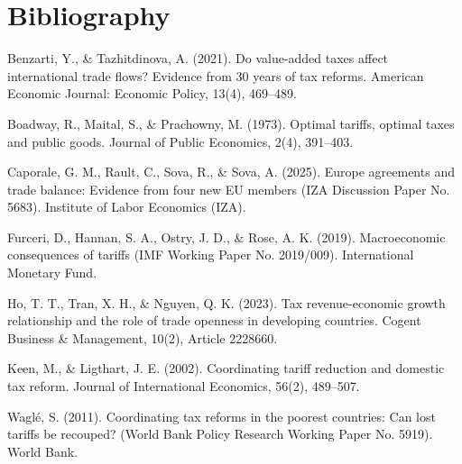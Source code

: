 \documentclass[12pt]{article}
\begin{document}
\newpage
\section*{Bibliography}
\singlespacing
\setlength{\parskip}{12pt}
\setlength{\parindent}{0pt}
\setlength{\leftskip}{0pt}

Benzarti, Y., \& Tazhitdinova, A. (2021). Do value-added taxes affect international trade flows? Evidence from 30 years of tax reforms. American Economic Journal: Economic Policy, 13(4), 469–489.


Boadway, R., Maital, S., \& Prachowny, M. (1973). Optimal tariffs, optimal taxes and public goods. Journal of Public Economics, 2(4), 391–403.


Caporale, G. M., Rault, C., Sova, R., \& Sova, A. (2025). Europe agreements and trade balance: Evidence from four new EU members (IZA Discussion Paper No. 5683). Institute of Labor Economics (IZA).


Furceri, D., Hannan, S. A., Ostry, J. D., \& Rose, A. K. (2019). Macroeconomic consequences of tariffs (IMF Working Paper No. 2019/009). International Monetary Fund.


Ho, T. T., Tran, X. H., \& Nguyen, Q. K. (2023). Tax revenue-economic growth relationship and the role of trade openness in developing countries. Cogent Business \& Management, 10(2), Article 2228660.


Keen, M., \& Ligthart, J. E. (2002). Coordinating tariff reduction and domestic tax reform. Journal of International Economics, 56(2), 489–507.


Waglé, S. (2011). Coordinating tax reforms in the poorest countries: Can lost tariffs be recouped? (World Bank Policy Research Working Paper No. 5919). World Bank.
\end{document}
